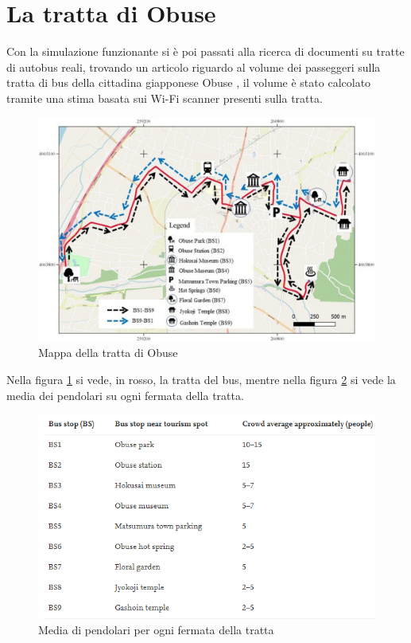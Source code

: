 \documentclass[12pt, openany]{book}
\begin{document}
 	\section{La tratta di Obuse}
 	Con la simulazione funzionante si è poi passati alla ricerca di documenti su tratte di autobus reali, trovando un articolo riguardo al volume dei passeggeri sulla tratta di bus della cittadina giapponese Obuse \cite{Obuse}, il volume è stato calcolato tramite una stima basata sui Wi-Fi scanner presenti sulla tratta.
 	\begin{figure}[H]
 		\centering
 		\includegraphics[width=1\linewidth]{"Immagini/MappaObuse.jpg"}
 		\caption{Mappa della tratta di Obuse}
 		\label{fig:Map}
 	\end{figure}
 	Nella figura \ref{fig:Map} si vede, in rosso, la tratta del bus, mentre nella figura \ref{fig:Pendolari} si vede la media dei pendolari su ogni fermata della tratta.
 	\begin{figure}[H]
 		\centering
 		\includegraphics[width=1\linewidth]{"Immagini/MediaPendolari.png"}
 		\caption{Media di pendolari per ogni fermata della tratta}
 		\label{fig:Pendolari}
 	\end{figure}
\end{document}
